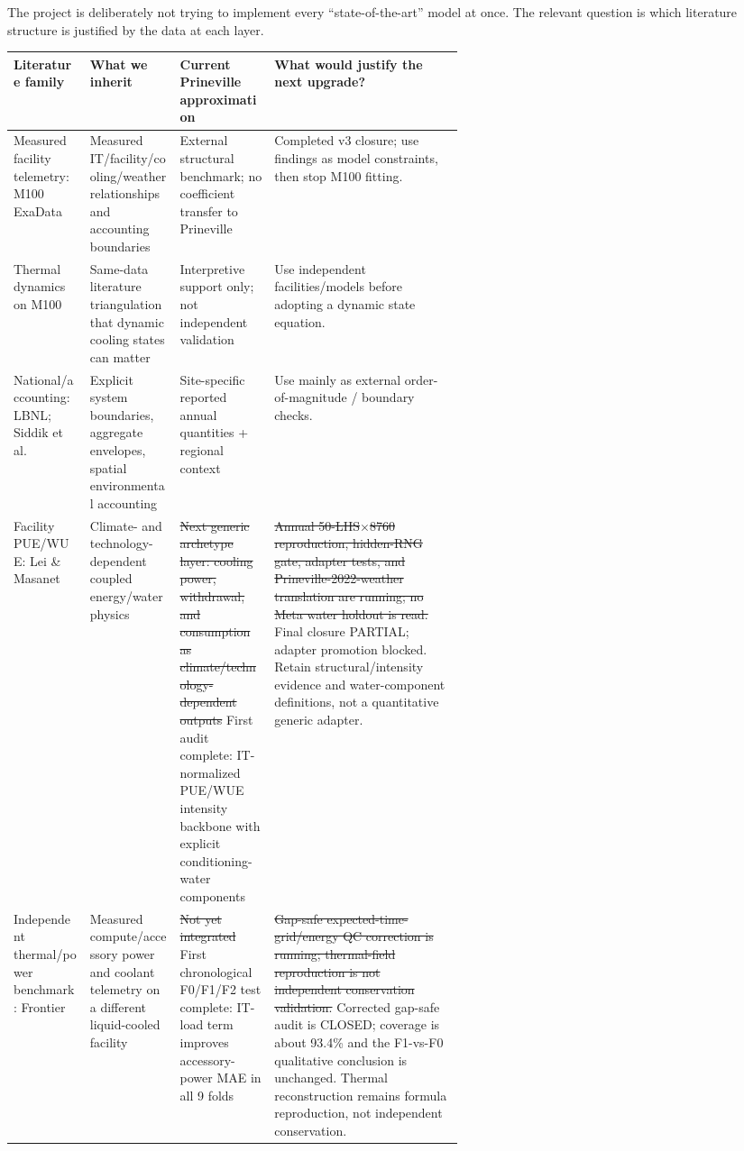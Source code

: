 \documentclass[11pt]{article}
\newcommand{\oldtxt}[1]{\textcolor{blue!70!black}{\sout{#1}}}
\newcommand{\newtxt}[1]{\textcolor{green!45!black}{#1}}
\newcommand{\latesttxt}[1]{\textcolor{purple!85!black}{#1}}
\begin{document}
The project is deliberately not trying to implement every ``state-of-the-art'' model at once. The relevant question is which literature structure is justified by the data at each layer.

\begin{center}
\scriptsize
\begin{tabularx}{\linewidth}{@{}p{0.17\linewidth}p{0.20\linewidth}p{0.21\linewidth}Y@{}}
\toprule
\textbf{Literature family} & \textbf{What we inherit} & \textbf{Current Prineville approximation} & \textbf{What would justify the next upgrade?} \\
\midrule
\newtxt{Measured facility telemetry: M100 ExaData \cite{m100exadata}} & \newtxt{Measured IT/facility/cooling/weather relationships and accounting boundaries} & \newtxt{External structural benchmark; no coefficient transfer to Prineville} & \newtxt{Completed v3 closure; use findings as model constraints, then stop M100 fitting.} \\
\newtxt{Thermal dynamics on M100 \cite{m100dynamic}} & \newtxt{Same-data literature triangulation that dynamic cooling states can matter} & \newtxt{Interpretive support only; not independent validation} & \newtxt{Use independent facilities/models before adopting a dynamic state equation.} \\
National/accounting: LBNL; Siddik et al.\ \cite{lbnl2024,siddik2021} & Explicit system boundaries, aggregate envelopes, spatial environmental accounting & Site-specific reported annual quantities + regional context & Use mainly as external order-of-magnitude / boundary checks. \\
Facility PUE/WUE: Lei \& Masanet\ \cite{lei2020,lei2022} & Climate- and technology-dependent coupled energy/water physics & \oldtxt{Next generic archetype layer: cooling power, withdrawal, and consumption as climate/technology-dependent outputs} \newtxt{First audit complete: IT-normalized PUE/WUE intensity backbone with explicit conditioning-water components} & \oldtxt{Annual 50-LHS\(\times\)8760 reproduction, hidden-RNG gate, adapter tests, and Prineville-2022-weather translation are running; no Meta water holdout is read.} \latesttxt{Final closure PARTIAL; adapter promotion blocked. Retain structural/intensity evidence and water-component definitions, not a quantitative generic adapter.} \\
\newtxt{Independent thermal/power benchmark: Frontier \cite{frontier2024}} & \newtxt{Measured compute/accessory power and coolant telemetry on a different liquid-cooled facility} & \oldtxt{Not yet integrated} \newtxt{First chronological F0/F1/F2 test complete: IT-load term improves accessory-power MAE in all 9 folds} & \oldtxt{Gap-safe expected-time-grid/energy QC correction is running; thermal-field reproduction is not independent conservation validation.} \latesttxt{Corrected gap-safe audit is CLOSED; coverage is about 93.4\% and the F1-vs-F0 qualitative conclusion is unchanged. Thermal reconstruction remains formula reproduction, not independent conservation.} \\

\end{tabularx}
\end{center}
\end{document}
